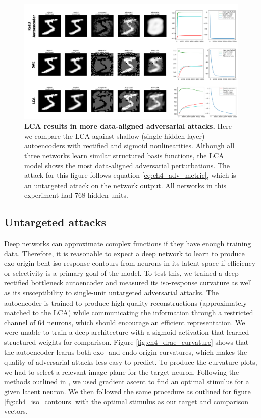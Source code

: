 \begin{figure}[h]
    \centering
    \includegraphics[width=\textwidth]{figures/adv_network_marzi_lca_sae_relu.png}
    \caption{\textbf{LCA results in more data-aligned adversarial attacks.} Here we compare the LCA against shallow (single hidden layer) autoencoders with rectified and sigmoid nonlinearities. Although all three networks learn similar structured basis functions, the LCA model shows the most data-aligned adversarial perturbations. The attack for this figure follows equation \eqref{eq:ch4_adv_metric}, which is an untargeted attack on the network output. All networks in this experiment had 768 hidden units.}
    \label{fig:ch4_marzi_network_attack}
\end{figure}



\subsection{Untargeted attacks}\label{sec:ch4_deep_relu_comparisons}
Deep networks can approximate complex functions if they have enough training data. Therefore, it is reasonable to expect a deep network to learn to produce exo-origin bent iso-response contours from neurons in its latent space if efficiency or selectivity is a primary goal of the model. To test this, we trained a deep rectified bottleneck autoencoder and measured its iso-response curvature as well as its susceptibility to single-unit untargeted adversarial attacks. The autoencoder is trained to produce high quality reconstructions (approximately matched to the LCA) while communicating the information through a restricted channel of 64 neurons, which should encourage an efficient representation. We were unable to train a deep architecture with a sigmoid activation that learned structured weights for comparison. Figure \ref{fig:ch4_drae_curvature} shows that the autoencoder learns both exo- and endo-origin curvatures, which makes the quality of adversarial attacks less easy to predict. To produce the curvature plots, we had to select a relevant image plane for the target neuron. Following the methods outlined in \parencite{mahendran2016visualizing}, we used gradient ascent to find an optimal stimulus for a given latent neuron. We then followed the same procedure as outlined for figure \ref{fig:ch4_iso_contours} with the optimal stimulus as our target and comparison vectors.

